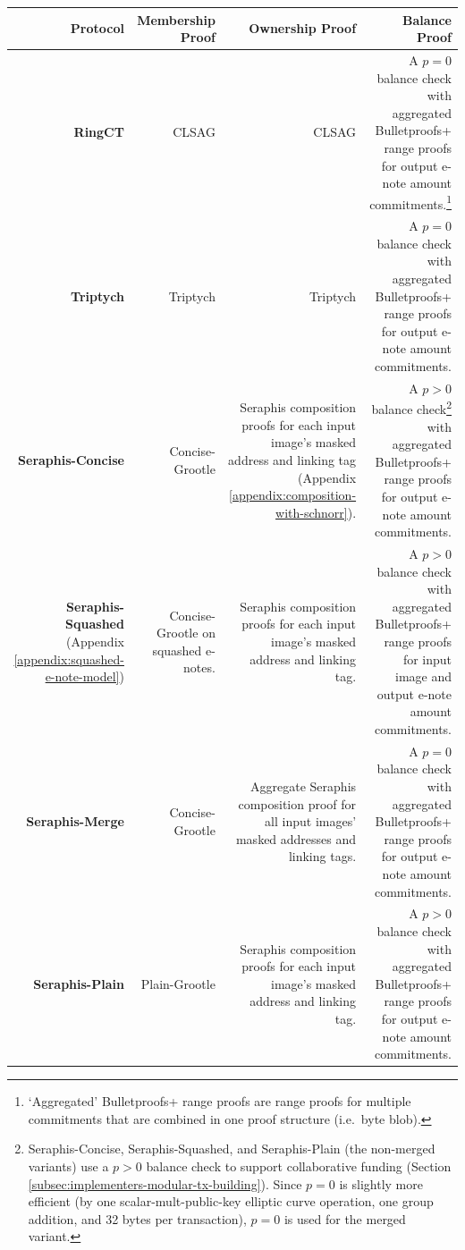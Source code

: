\begin{tabularx}{\textwidth}{|R|R|R|R|}
\caption{Transaction Protocols Overview}
\label{table:efficiency-transaction-protocols-overview}\\
\hline
    \textbf{Protocol} & Membership Proof & Ownership Proof & Balance Proof \\
\hline\hline
    \textbf{RingCT} \cite{MRL-0005-ringct} & CLSAG \cite{clsag-eprint} & CLSAG & A $p = 0$ balance check with aggregated Bulletproofs+ range proofs \cite{bulletproofs_plus} for output e-note amount commitments.\footnote{`Aggregated' Bulletproofs+ range proofs are range proofs for multiple commitments that are combined in one proof structure (i.e.\ byte blob).} \\
\hline
    \textbf{Triptych} \cite{triptych-preprint} & Triptych & Triptych & A $p = 0$ balance check with aggregated Bulletproofs+ range proofs \cite{bulletproofs_plus} for output e-note amount commitments. \\
\hline
    \textbf{Seraphis-Concise} & Concise-Grootle & Seraphis composition proofs for each input image's masked address and linking tag (Appendix \ref{appendix:composition-with-schnorr}). & A $p > 0$ balance check\footnote{Seraphis-Concise, Seraphis-Squashed, and Seraphis-Plain (the non-merged variants) use a $p > 0$ balance check to support collaborative funding (Section \ref{subsec:implementers-modular-tx-building}). Since $p = 0$ is slightly more efficient (by one scalar-mult-public-key elliptic curve operation, one group addition, and 32 bytes per transaction), $p = 0$ is used for the merged variant.} with aggregated Bulletproofs+ range proofs for output e-note amount commitments. \\
\hline
    \textbf{Seraphis-Squashed} (Appendix \ref{appendix:squashed-e-note-model}) & Concise-Grootle on squashed e-notes. & Seraphis composition proofs for each input image's masked address and linking tag. & A $p > 0$ balance check with aggregated Bulletproofs+ range proofs for input image and output e-note amount commitments.  \\
\hline
    \textbf{Seraphis-Merge} & Concise-Grootle & Aggregate Seraphis composition proof for all input images' masked addresses and linking tags. & A $p = 0$ balance check with aggregated Bulletproofs+ range proofs for output e-note amount commitments. \\
\hline
    \textbf{Seraphis-Plain} & Plain-Grootle & Seraphis composition proofs for each input image's masked address and linking tag. & A $p > 0$ balance check with aggregated Bulletproofs+ range proofs for output e-note amount commitments. \\
\hline
\end{tabularx}

